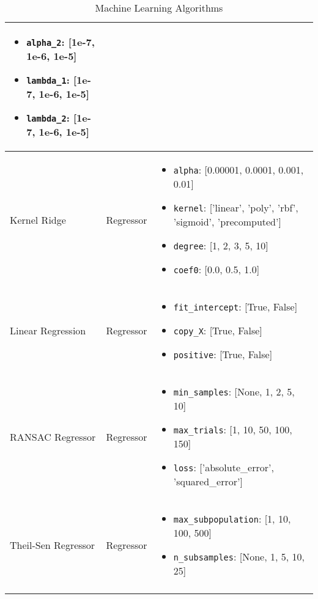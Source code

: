 \begin{longtable}{|>{\raggedright}p{2cm}|>{\raggedright}p{3cm}|>{\raggedright\arraybackslash}p{8cm}|}
\begin{itemize}
    \item \texttt{alpha\_2}: [1e-7, 1e-6, 1e-5]
    \item \texttt{lambda\_1}: [1e-7, 1e-6, 1e-5]
    \item \texttt{lambda\_2}: [1e-7, 1e-6, 1e-5]
\end{itemize} \\
\hline
Kernel Ridge & Regressor & 
\begin{itemize}
    \item \texttt{alpha}: [0.00001, 0.0001, 0.001, 0.01]
    \item \texttt{kernel}: ['linear', 'poly', 'rbf', 'sigmoid', 'precomputed']
    \item \texttt{degree}: [1, 2, 3, 5, 10]
    \item \texttt{coef0}: [0.0, 0.5, 1.0]
\end{itemize} \\
\hline
Linear Regression & Regressor & 
\begin{itemize}
    \item \texttt{fit\_intercept}: [True, False]
    \item \texttt{copy\_X}: [True, False]
    \item \texttt{positive}: [True, False]
\end{itemize} \\
\hline
RANSAC Regressor & Regressor & 
\begin{itemize}
    \item \texttt{min\_samples}: [None, 1, 2, 5, 10]
    \item \texttt{max\_trials}: [1, 10, 50, 100, 150]
    \item \texttt{loss}: ['absolute\_error', 'squared\_error']
\end{itemize} \\
\hline
Theil-Sen Regressor & Regressor & 
\begin{itemize}
    \item \texttt{max\_subpopulation}: [1, 10, 100, 500]
    \item \texttt{n\_subsamples}: [None, 1, 5, 10, 25]
\end{itemize} \\
\hline

\caption{Machine Learning Algorithms}
\label{tab:all_algorithms}
\end{longtable}